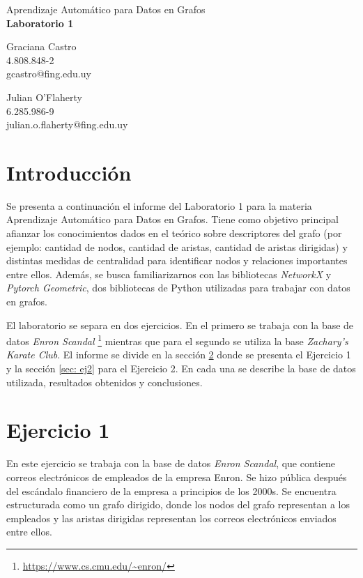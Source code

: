 \documentclass{article}
\begin{document}
\begin{center}
    {\Large Aprendizaje Automático para Datos en Grafos} \\
    {\LARGE \textbf{Laboratorio 1}} \\
    \vspace{2em}
    \begin{minipage}{0.45\textwidth}
        \centering
        Graciana Castro \\
        4.808.848-2 \\
        gcastro@fing.edu.uy
    \end{minipage}
    \hfill
    \begin{minipage}{0.45\textwidth}
        \centering
        Julian O'Flaherty \\
        6.285.986-9 \\
        julian.o.flaherty@fing.edu.uy
    \end{minipage}
\end{center}


\section{Introducción}
Se presenta a continuación el informe del Laboratorio 1 para la materia Aprendizaje Automático para Datos en Grafos. Tiene como objetivo principal afianzar los conocimientos dados en el teórico sobre descriptores del grafo (por ejemplo: cantidad de nodos, cantidad de aristas, cantidad de aristas dirigidas) y distintas medidas de centralidad para identificar nodos y relaciones importantes entre ellos. Además, se busca familiarizarnos con las bibliotecas \textit{NetworkX} y \textit{Pytorch Geometric}, dos bibliotecas de Python utilizadas para trabajar con datos en grafos.

El laboratorio se separa en dos ejercicios. En el primero se trabaja con la base de datos \textit{Enron Scandal} \footnote{\url{https://www.cs.cmu.edu/~enron/}} mientras que para el segundo se utiliza la base \textit{Zachary's Karate Club}. El informe se divide en la sección \ref{sec: ej1} donde se presenta el Ejercicio 1 y la sección \ref{sec: ej2} para el Ejercicio 2. En cada una se describe la base de datos utilizada, resultados obtenidos y conclusiones.

\section{Ejercicio 1} \label{sec: ej1}
En este ejercicio se trabaja con la base de datos \textit{Enron Scandal}, que contiene correos electrónicos de empleados de la empresa Enron. Se hizo pública después del escándalo financiero de la empresa a principios de los 2000s. Se encuentra estructurada como un grafo dirigido, donde los nodos del grafo representan a los empleados y las aristas dirigidas representan los correos electrónicos enviados entre ellos.
\end{document}
